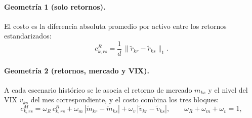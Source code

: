 \paragraph{Geometría 1 (solo retornos).} El costo es la diferencia absoluta promedio por activo entre los retornos estandarizados:
\begin{equation}\label{eq:g1}
c^{R}_{k,rs}=\frac1d\,\bigl\|\tilde r_{kr}-\tilde r_{ks}\bigr\|_1 .
\end{equation}

\paragraph{Geometría 2 (retornos, mercado y VIX).} A cada escenario histórico se le asocia el retorno de mercado $m_{ks}$ y el nivel del VIX $v_{ks}$ del mes correspondiente, y el costo combina los tres bloques:
\begin{equation}\label{eq:g2}
c^{M}_{k,rs}=\omega_R\,c^{R}_{k,rs}+\omega_m\,|\tilde m_{kr}-\tilde m_{ks}|+\omega_v\,|\tilde v_{kr}-\tilde v_{ks}|,\qquad \omega_R+\omega_m+\omega_v=1,
\end{equation}

